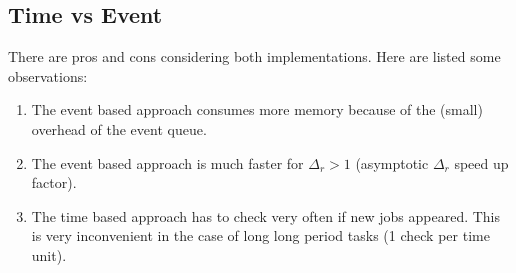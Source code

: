 \subsection{Time vs Event}

There are pros and cons considering both implementations. Here are listed some observations:

\begin{enumerate}
	\item The event based approach consumes more memory because of the (small) overhead of the event queue.
	\item The event based approach is much faster for $\Delta_r > 1$ (asymptotic $\Delta_r$ speed up factor).
	\item The time based approach has to check very often if new jobs appeared. This is very inconvenient in the case of long long period tasks (1 check per time unit).
\end{enumerate}
